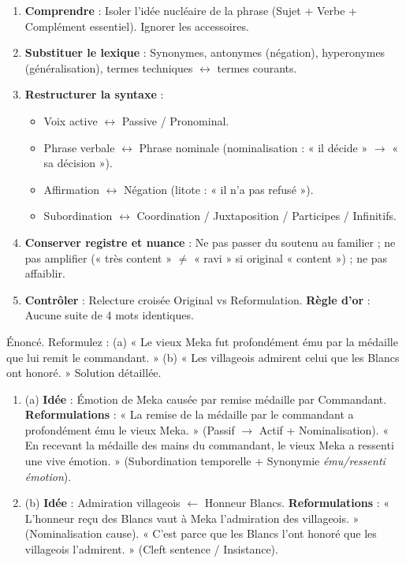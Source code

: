 \documentclass[11pt]{article}
\begin{document}
\begin{methode}
\begin{enumerate}
\item \textbf{Comprendre} : Isoler l'idée nucléaire de la phrase (Sujet + Verbe + Complément essentiel). Ignorer les accessoires.
\item \textbf{Substituer le lexique} : Synonymes, antonymes (négation), hyperonymes (généralisation), termes techniques $\leftrightarrow$ termes courants.
\item \textbf{Restructurer la syntaxe} :
\begin{itemize}
\item Voix active $\leftrightarrow$ Passive / Pronominal.
\item Phrase verbale $\leftrightarrow$ Phrase nominale (nominalisation : « il décide » $\rightarrow$ « sa décision »).
\item Affirmation $\leftrightarrow$ Négation (litote : « il n'a pas refusé »).
\item Subordination $\leftrightarrow$ Coordination / Juxtaposition / Participes / Infinitifs.
\end{itemize}
\item \textbf{Conserver registre et nuance} : Ne pas passer du soutenu au familier ; ne pas amplifier (« très content » $\neq$ « ravi » si original « content ») ; ne pas affaiblir.
\item \textbf{Contrôler} : Relecture croisée Original vs Reformulation. \textbf{Règle d'or} : Aucune suite de 4 mots identiques.
\end{enumerate}
\end{methode}

\begin{exoresolu}
Énoncé. Reformulez : (a) « Le vieux Meka fut profondément ému par la médaille que lui remit le commandant. » (b) « Les villageois admirent celui que les Blancs ont honoré. »
\tcblower
Solution détaillée.
\begin{enumerate}
\item (a) \textbf{Idée} : Émotion de Meka causée par remise médaille par Commandant.
\textbf{Reformulations} : « La remise de la médaille par le commandant a profondément ému le vieux Meka. » (Passif $\rightarrow$ Actif + Nominalisation). « En recevant la médaille des mains du commandant, le vieux Meka a ressenti une vive émotion. » (Subordination temporelle + Synonymie \emph{ému/ressenti émotion}).
\item (b) \textbf{Idée} : Admiration villageois $\leftarrow$ Honneur Blancs.
\textbf{Reformulations} : « L'honneur reçu des Blancs vaut à Meka l'admiration des villageois. » (Nominalisation cause). « C'est parce que les Blancs l'ont honoré que les villageois l'admirent. » (Cleft sentence / Insistance).
\end{enumerate}
\end{exoresolu}
\end{document}
